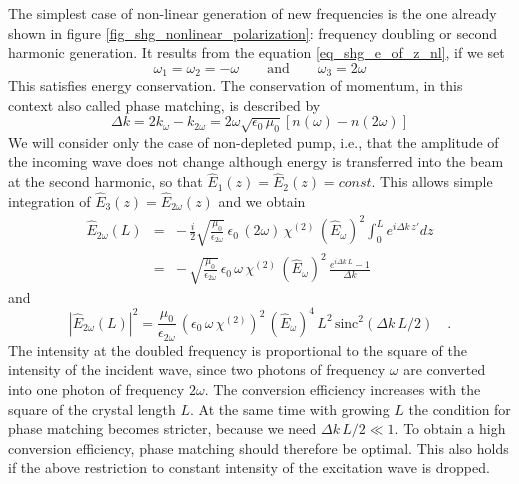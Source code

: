 The simplest case of non-linear generation of new frequencies
is the one already shown in figure \ref{fig_shg_nonlinear_polarization}: 
 frequency doubling or second harmonic generation. It results from the equation
\ref{eq_shg_e_of_z_nl}, if we set
\begin{equation}
  \omega_1 = \omega_2 = - \omega \qquad \text{and} \qquad
  \omega_3 = 2\omega
\end{equation}
This satisfies  energy conservation. The
conservation of momentum, in this context also called phase matching, is described by
\begin{equation}
 \Delta k = 2 k_{\omega} - k_{2 \omega} = 2 \omega
 \sqrt{\epsilon_0 \, \mu_0} \left[ n(\omega) - n(2 \omega) \right]
\end{equation}
We will consider only the case of non-depleted pump, i.e., that the amplitude of the incoming wave does not change although energy is transferred into the beam at the second harmonic, so that
$\hat{E}_1(z) = \hat{E}_2(z)
= const$. This allows simple integration of $\hat{E}_3(z) = \hat{E}_{2\omega}(z)$
and we obtain
\begin{eqnarray}
 \hat{E}_{2\omega}(L) &=& - \, \frac{i}{2}   \sqrt{ \frac{\mu_0} {\epsilon_{2\omega}}}\,\epsilon_0
  \, (2 \omega) \, \chi^{(2)} \, (\hat{E}_{\omega})^2   \int_0^L  e^{i  \Delta k \,
  z'} dz  \\
  &= & %
- \,    \sqrt{ \frac{\mu_0} {\epsilon_{2\omega}}}\,\epsilon_0
  \,  \omega \, \chi^{(2)} \, (\hat{E}_{\omega})^2  \, \frac{  e^{i  \Delta k \,
  L} -1}{\Delta k}
\end{eqnarray}
and
\begin{equation}
  \left| \hat{E}_{2\omega}(L) \right|^2 = %
  \frac{\mu_0} {\epsilon_{2\omega}} \, \left(\epsilon_0
  \,  \omega \, \chi^{(2)} \right)^2 \, (\hat{E}_{\omega})^4  \, L^2 \, \text{sinc}^2 ( \Delta k \, L /2 )
   \quad . \label{eq_shg_efficiency_shg}
\end{equation}
The intensity at the doubled frequency is proportional to
the square of the intensity of the incident wave, since two photons
of frequency $\omega$ are converted into one photon of frequency $2\omega$. The conversion efficiency increases with the
square of the crystal  length $L$. At the same time with 
growing $L$ the condition for phase matching becomes stricter, because we need 
$\Delta k \, L / 2 \ll 1 $. To obtain a high
conversion efficiency, phase matching should therefore be
 optimal. This also holds if the above restriction to
constant intensity of the excitation wave is dropped.

